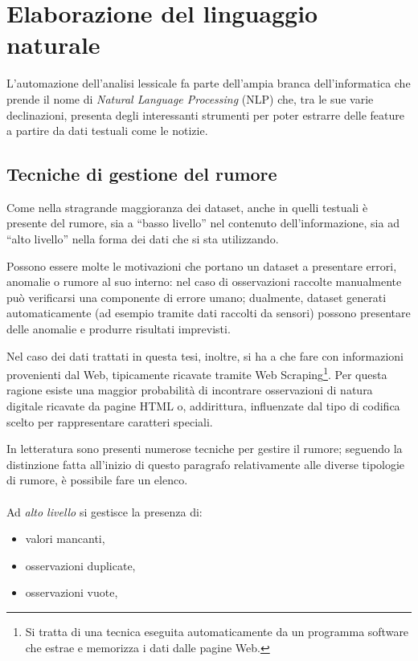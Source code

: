 \documentclass[12pt]{report}
\theoremstyle{definition}
\begin{document}
\section{Elaborazione del linguaggio naturale} \label{nlp}
L'automazione dell'analisi lessicale fa parte dell'ampia branca dell'informatica che prende il nome di \textit{Natural Language Processing} (NLP) che, tra le sue varie declinazioni, presenta degli interessanti strumenti per poter estrarre delle feature a partire da dati testuali come le notizie.


\subsection{Tecniche di gestione del rumore} \label{clean}
Come nella stragrande maggioranza dei dataset, anche in quelli testuali è presente del rumore, sia a ``basso livello'' nel contenuto dell'informazione, sia ad ``alto livello'' nella forma dei dati che si sta utilizzando.

Possono essere molte le motivazioni che portano un dataset a presentare errori, anomalie o rumore al suo interno: 
nel caso di osservazioni raccolte manualmente può verificarsi una componente di errore umano; dualmente, dataset generati automaticamente (ad esempio tramite dati raccolti da sensori) possono presentare delle anomalie e produrre risultati imprevisti.

Nel caso dei dati trattati in questa tesi, inoltre, si ha a che fare con informazioni provenienti dal Web, tipicamente ricavate tramite Web Scraping\footnote{Si tratta di una tecnica eseguita automaticamente da un programma software che estrae e memorizza i dati dalle pagine Web.}. Per questa ragione esiste una maggior probabilità di incontrare osservazioni di natura digitale ricavate da pagine HTML o, addirittura, influenzate dal tipo di codifica scelto per rappresentare caratteri speciali.

In letteratura sono presenti numerose tecniche per gestire il rumore; seguendo la distinzione fatta all'inizio di questo paragrafo relativamente alle diverse tipologie di rumore, è possibile fare un elenco.
\\
\\
Ad \textit{alto livello} si gestisce la presenza di:
\begin{itemize}
    \item valori mancanti,
    \item osservazioni duplicate,
    \item osservazioni vuote,
\end{itemize}
\end{document}
